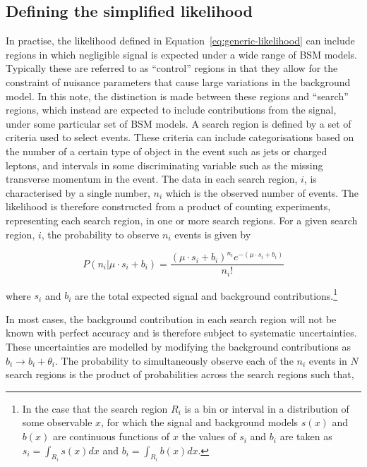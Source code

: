 \subsection{Defining the simplified likelihood}
In practise, the likelihood defined in Equation~\ref{eq:generic-likelihood} can include regions in which negligible signal is expected under a wide 
range of BSM models. Typically these are referred to as ``control'' regions in that they allow for the constraint of nuisance parameters that  
cause large variations in the background model.
In this note, the distinction is made between these regions and ``search'' regions, which instead 
are expected to include contributions from the signal, under some particular set of BSM models. A search region 
is defined by a set of criteria used to select events. These criteria can include categorisations based on 
the number of a certain type of object in the event such as jets or 
charged leptons, and intervals in some discriminating variable such as the missing transverse momentum in the event. The data in each search region, $i$, is characterised 
by a single number, $n_{i}$ which is the observed number of events. The likelihood is therefore constructed from a product of counting 
experiments, representing each search region, in one or more search regions. 
For a given search region, $i$, the probability to observe $n_{i}$ events is given by

\begin{equation}
 P(n_{i}|\mu \cdot s_{i}+b_{i}) = \dfrac{(\mu \cdot s_{i}+b_{i})^{n_{i}} e^{-(\mu \cdot s_{i}+b_{i})} }{n_{i}!}
\label{eq:poisson-likelihood}
\end{equation}

where $s_{i}$ and $b_{i}$ are the total expected signal and background contributions.\footnote{In the case 
that the search region $R_{i}$ is a bin or interval in a distribution of some observable $x$, for which the signal and background models $s(x)$ 
and $b(x)$ are continuous functions of $x$ the values of $s_{i}$ and $b_{i}$ are taken as 
$s_{i}=\int_{R_{i}} s(x)dx$ and $b_{i}=\int_{R_{i}} b(x)dx$.}

In most cases, the background contribution in each search region will not be known with perfect accuracy and is therefore 
subject to systematic uncertainties. These uncertainties are modelled by modifying the background contributions as 
$b_{i}\rightarrow b_{i}+\theta_{i}$. 
The probability to simultaneously observe each of the $n_{i}$ events in $N$ search regions is the product of probabilities across the search regions such that,

